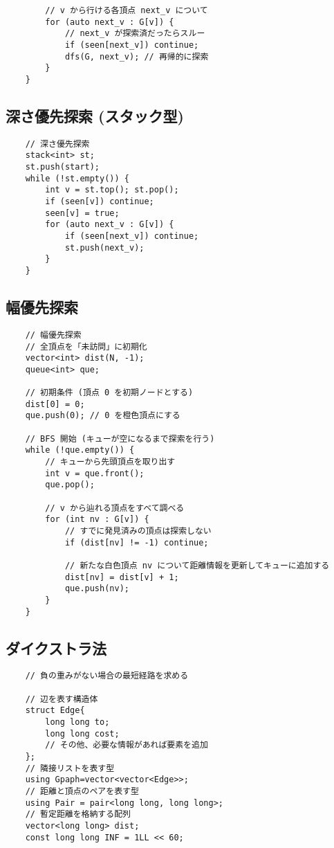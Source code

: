 \documentclass[a4paper, landscape, 9pt]{jarticle} %
\begin{document}
\begin{multicols*}{3}
\begin{lstlisting}
        // v から行ける各頂点 next_v について
        for (auto next_v : G[v]) { 
            // next_v が探索済だったらスルー
            if (seen[next_v]) continue;
            dfs(G, next_v); // 再帰的に探索
        }
    }
    \end{lstlisting}

    \subsection{深さ優先探索 (スタック型)}
    \begin{lstlisting}
    // 深さ優先探索
    stack<int> st;
    st.push(start);
    while (!st.empty()) {
        int v = st.top(); st.pop();
        if (seen[v]) continue;
        seen[v] = true;
        for (auto next_v : G[v]) {
            if (seen[next_v]) continue;
            st.push(next_v);
        }
    }
    \end{lstlisting}

    \subsection{幅優先探索}
    \begin{lstlisting}
    // 幅優先探索
    // 全頂点を「未訪問」に初期化
    vector<int> dist(N, -1); 
    queue<int> que;

    // 初期条件 (頂点 0 を初期ノードとする)
    dist[0] = 0;
    que.push(0); // 0 を橙色頂点にする

    // BFS 開始 (キューが空になるまで探索を行う)
    while (!que.empty()) {
        // キューから先頭頂点を取り出す
        int v = que.front(); 
        que.pop();

        // v から辿れる頂点をすべて調べる
        for (int nv : G[v]) {
            // すでに発見済みの頂点は探索しない
            if (dist[nv] != -1) continue; 

            // 新たな白色頂点 nv について距離情報を更新してキューに追加する
            dist[nv] = dist[v] + 1;
            que.push(nv);
        }
    }
    \end{lstlisting}

    \subsection{ダイクストラ法}
    \begin{lstlisting}
    // 負の重みがない場合の最短経路を求める

    // 辺を表す構造体
    struct Edge{
        long long to;
        long long cost;
        // その他、必要な情報があれば要素を追加
    };
    // 隣接リストを表す型
    using Gpaph=vector<vector<Edge>>;
    // 距離と頂点のペアを表す型
    using Pair = pair<long long, long long>; 
    // 暫定距離を格納する配列
    vector<long long> dist; 
    const long long INF = 1LL << 60;
    

\end{lstlisting}
\end{multicols*}
\end{document}
